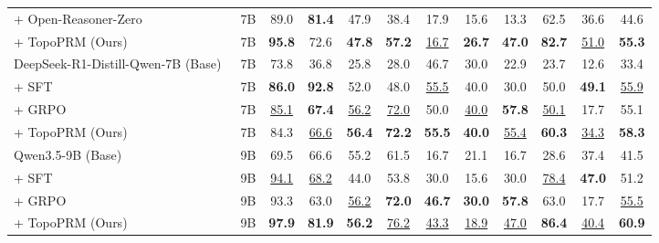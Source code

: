 \begin{table}[!htb]
{\begin{tabular}{@{}l c cc cc ccc cc c@{}}
\quad + Open-Reasoner-Zero~\citep{hu2026open} & 7B & 89.0 & \textbf{81.4} & 47.9 & 38.4 & 17.9 & 15.6 & 13.3 & 62.5 & 36.6 & 44.6 \\
\rowcolor{blue!6}
\quad + TopoPRM (Ours) & 7B & \textbf{95.8} & 72.6 & \textbf{47.8} & \textbf{57.2} & \underline{16.7} & \textbf{26.7} & \textbf{47.0} & \textbf{82.7} & \underline{51.0} & \textbf{55.3} \\
\midrule
\rowcolor{gray!10}
DeepSeek-R1-Distill-Qwen-7B (Base)~\citep{deepseekr1} & 7B & 73.8 & 36.8 & 25.8 & 28.0 & 46.7 & 30.0 & 22.9 & 23.7 & 12.6 & 33.4 \\
\quad + SFT & 7B & \textbf{86.0} & \textbf{92.8} & 52.0 & 48.0 & \underline{55.5} & 40.0 & 30.0 & 50.0 & \textbf{49.1} & \underline{55.9} \\
\quad + GRPO~\citep{shao2024deepseekmath} & 7B & \underline{85.1} & \textbf{67.4} & \underline{56.2} & \underline{72.0} & 50.0 & \underline{40.0} & \textbf{57.8} & \underline{50.1} & 17.7 & 55.1 \\
\rowcolor{blue!6}
\quad + TopoPRM (Ours) & 7B & 84.3 & \underline{66.6} & \textbf{56.4} & \textbf{72.2} & \textbf{55.5} & \textbf{40.0} & \underline{55.4} & \textbf{60.3} & \underline{34.3} & \textbf{58.3} \\
\midrule
\rowcolor{gray!10}
Qwen3.5-9B (Base) & 9B & 69.5 & 66.6 & 55.2 & 61.5 & 16.7 & 21.1 & 16.7 & 28.6 & 37.4 & 41.5 \\
\quad + SFT & 9B & \underline{94.1} & \underline{68.2} & 44.0 & 53.8 & 30.0 & 15.6 & 30.0 & \underline{78.4} & \textbf{47.0} & 51.2 \\
\quad + GRPO~\citep{shao2024deepseekmath} & 9B & 93.3 & 63.0 & \underline{56.2} & \textbf{72.0} & \textbf{46.7} & \textbf{30.0} & \textbf{57.8} & 63.0 & 17.7 & \underline{55.5} \\
\rowcolor{blue!6}
\quad + TopoPRM (Ours) & 9B & \textbf{97.9} & \textbf{81.9} & \textbf{56.2} & \underline{76.2} & \underline{43.3} & \underline{18.9} & \underline{47.0} & \textbf{86.4} & \underline{40.4} & \textbf{60.9} \\
\bottomrule
\end{tabular}%
}
\end{table}

